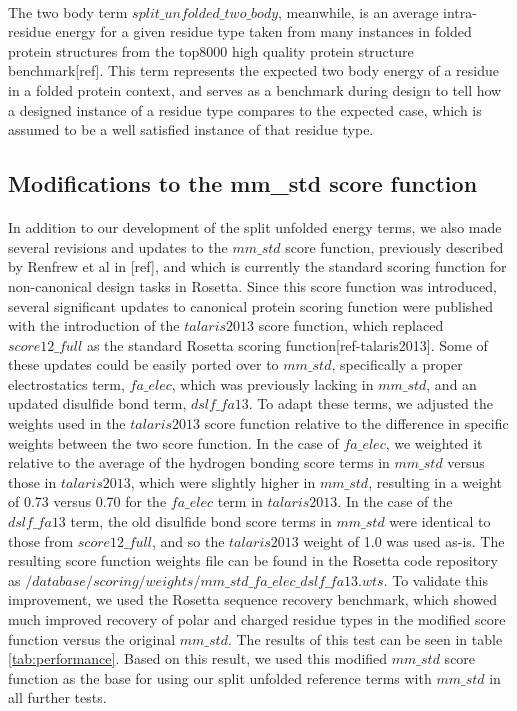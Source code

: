 \paragraph{}
The two body term $split\_unfolded\_two\_body$, meanwhile, is an average intra-residue energy for a given residue type taken from many instances in folded protein structures from the top8000 high quality protein structure benchmark[ref].
This term represents the expected two body energy of a residue in a folded protein context, and serves as a benchmark during design to tell how a designed instance of a residue type compares to the expected case, which is assumed to be a well satisfied instance of that residue type. 

\subsection{Modifications to the mm\_std score function}
\paragraph{}
In addition to our development of the split unfolded energy terms, we also made several revisions and updates to the $mm\_std$ score function, previously described by Renfrew et al in [ref], and which is currently the standard scoring function for non-canonical design tasks in Rosetta.
Since this score function was introduced, several significant updates to canonical protein scoring function were published with the introduction of the $talaris2013$ score function, which replaced $score12\_full$ as the standard Rosetta scoring function[ref-talaris2013].
Some of these updates could be easily ported over to $mm\_std$, specifically a proper electrostatics term, $fa\_elec$, which was previously lacking in $mm\_std$, and an updated disulfide bond term, $dslf\_fa13$.
To adapt these terms, we adjusted the weights used in the $talaris2013$ score function relative to the difference in specific weights between the two score function.
In the case of $fa\_elec$, we weighted it relative to the average of the hydrogen bonding score terms in $mm\_std$ versus those in $talaris2013$, which were slightly higher in $mm\_std$, resulting in a weight of 0.73 versus 0.70 for the $fa\_elec$ term in $talaris2013$.
In the case of the $dslf\_fa13$ term, the old disulfide bond score terms in $mm\_std$ were identical to those from $score12\_full$, and so the $talaris2013$ weight of 1.0 was used as-is.
The resulting score function weights file can be found in the Rosetta code repository as $/database/scoring/weights/mm\_std\_fa\_elec\_dslf\_fa13.wts$.
To validate this improvement, we used the Rosetta sequence recovery benchmark, which showed much improved recovery of polar and charged residue types in the modified score function versus the original $mm\_std$.
The results of this test can be seen in table \ref{tab:performance}.
Based on this result, we used this modified $mm\_std$ score function as the base for using our split unfolded reference terms with $mm\_std$ in all further tests.


